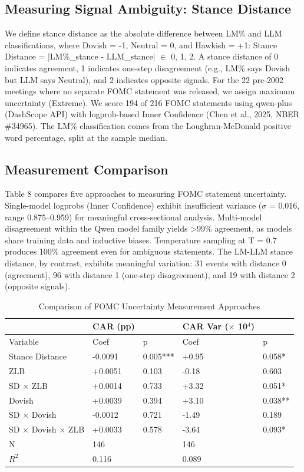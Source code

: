 \documentclass[12pt,a4paper]{article}
\begin{document}
\subsection{Measuring Signal Ambiguity: Stance Distance}

We define stance distance as the absolute difference between LM\% and LLM classifications, where Dovish = -1, Neutral = 0, and Hawkish = +1: Stance Distance = |LM\%\_stance - LLM\_stance| $\in$ {0, 1, 2}. A stance distance of 0 indicates agreement, 1 indicates one-step disagreement (e.g., LM\% says Dovish but LLM says Neutral), and 2 indicates opposite signals. For the 22 pre-2002 meetings where no separate FOMC statement was released, we assign maximum uncertainty (Extreme). We score 194 of 216 FOMC statements using qwen-plus (DashScope API) with logprob-based Inner Confidence (Chen et al., 2025, NBER \#34965). The LM\% classification comes from the Loughran-McDonald positive word percentage, split at the sample median.

\subsection{Measurement Comparison}

Table 8 compares five approaches to measuring FOMC statement uncertainty. Single-model logprobs (Inner Confidence) exhibit insufficient variance ($\sigma$ = 0.016, range 0.875–0.959) for meaningful cross-sectional analysis. Multi-model disagreement within the Qwen model family yields >99\% agreement, as models share training data and inductive biases. Temperature sampling at T = 0.7 produces 100\% agreement even for ambiguous statements. The LM-LLM stance distance, by contrast, exhibits meaningful variation: 31 events with distance 0 (agreement), 96 with distance 1 (one-step disagreement), and 19 with distance 2 (opposite signals).

\begin{table}[H]
\centering
\caption{Comparison of FOMC Uncertainty Measurement Approaches}
\label{tab:uncertainty}
\small
\begin{tabular}{lllll}
\toprule
 & CAR (pp) &  & CAR Var ($\times$ 10$^{4}$) &  \\
\midrule
Variable & Coef & p & Coef & p \\
Stance Distance & -0.0091 & 0.005*** & +0.95 & 0.058* \\
ZLB & +0.0051 & 0.103 & -0.18 & 0.603 \\
SD $\times$  ZLB & +0.0014 & 0.733 & +3.32 & 0.051* \\
Dovish & +0.0039 & 0.394 & +3.10 & 0.038** \\
SD $\times$  Dovish & -0.0012 & 0.721 & -1.49 & 0.189 \\
SD $\times$  Dovish $\times$  ZLB & +0.0033 & 0.578 & -3.64 & 0.093* \\
N & 146 &  & 146 &  \\
$R^2$ & 0.116 &  & 0.089 &  \\
\bottomrule
\end{tabular}
\end{table}
\end{document}
